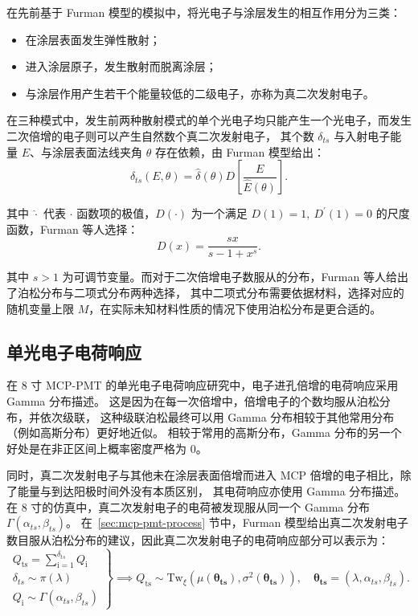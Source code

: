在先前基于 Furman 模型\cite{PhysRevSTAB.5.124404}的模拟\cite{chenOptimizationElectronCollection2016}中，将光电子与涂层发生的相互作用分为三类：
\begin{itemize}
    \item 在涂层表面发生弹性散射；
    \item 进入涂层原子，发生散射而脱离涂层；
    \item 与涂层作用产生若干个能量较低的二级电子，亦称为真二次发射电子。
\end{itemize}

在三种模式中，发生前两种散射模式的单个光电子均只能产生一个光电子，而发生二次倍增的电子则可以产生自然数个真二次发射电子，
其个数 $\delta_{ts}$ 与入射电子能量 $E$、与涂层表面法线夹角 $\theta$ 存在依赖，由 Furman 模型给出：
\begin{equation}
    \delta_{ts}(E,\theta)=\hat{\delta}(\theta)D\left[\frac{E}{\hat{E}(\theta)}\right].
\end{equation}

其中 $\hat{\cdot}$ 代表 $\cdot$ 函数项的极值，$D(\cdot)$ 为一个满足 $D(1)=1,\ D^\prime(1)=0$ 的尺度函数，Furman 等人选择：
\begin{equation}
    D(x)=\frac{sx}{s-1+x^s}.
\end{equation}

其中 $s>1$ 为可调节变量。而对于二次倍增电子数服从的分布，Furman 等人给出了泊松分布与二项式分布两种选择，
其中二项式分布需要依据材料，选择对应的随机变量上限 $M$，在实际未知材料性质的情况下使用泊松分布是更合适的。

\subsection{单光电子电荷响应}\label{sec:spe-charge}
在 8 寸 MCP-PMT 的单光电子电荷响应研究\cite{wengSingleElectronCharge2024}中，电子进孔倍增的电荷响应采用 Gamma 分布描述。
这是因为在每一次倍增中，倍增电子的个数均服从泊松分布，并依次级联，
这种级联泊松最终可以用 Gamma 分布相较于其他常用分布（例如高斯分布）更好地近似。
相较于常用的高斯分布，Gamma 分布的另一个好处是在非正区间上概率密度严格为 0。

同时，真二次发射电子与其他未在涂层表面倍增而进入 MCP 倍增的电子相比，除了能量与到达阳极时间外没有本质区别，
其电荷响应亦使用 Gamma 分布描述。在 8 寸的仿真中，真二次发射电子的电荷被发现服从同一个 Gamma 分布 $\Gamma(\alpha_{ts}, \beta_{ts})$。
在~\ref{sec:mcp-pmt-process} 节中，Furman 模型给出真二次发射电子数目服从泊松分布的建议，因此真二次发射电子的电荷响应部分可以表示为：
\begin{equation}
    \left.
        \begin{array}{c}
        Q_\mathrm{ts}=\sum_{\mathrm{i=1}}^{\delta_{ts}}Q_\mathrm{i}\\
        \delta_{ts}\sim\pi(\lambda)\\
        Q_\mathrm{i}\sim\Gamma(\alpha_{ts},\beta_{ts})
        \end{array}
    \right\}\implies
    Q_\mathrm{ts}\sim\mathrm{Tw}_{\xi}
    \left(\mu(\boldsymbol{\theta_{ts}}),\sigma^2(\boldsymbol{\theta_{ts}})\right),\quad
    \boldsymbol{\theta_{ts}}=(\lambda, \alpha_{ts},\beta_{ts}).
    \label{eq:compound-poisson-gamma}
\end{equation}

